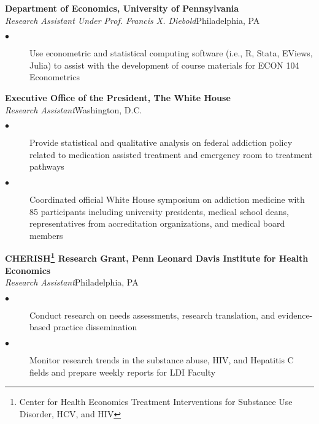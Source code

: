 \documentclass[10pt, letterpaper]{article}
\newcommand{\years}[1]{\marginnote{\normalsize #1}}
\begin{document}
\years{2017-2018}
\textbf{Department of Economics, University of Pennsylvania}\\%
\emph{Research Assistant Under Prof. Francis X. Diebold}\hfill Philadelphia, PA
\begin{description}
    \item[$\bullet$] Use econometric and statistical computing software (i.e., R, Stata, EViews, Julia) to assist with the development of course materials for ECON 104 Econometrics
    \\[.2cm]
\end{description}



\years{2016}
 \textbf{Executive Office of the President, The White House}\\%
 \emph{Research Assistant}\hfill Washington, D.C.
\begin{description}
    \item[$\bullet$] Provide statistical and qualitative analysis on federal addiction policy related to medication assisted treatment and emergency room to treatment pathways
    \item[$\bullet$] Coordinated official %
    White House symposium on addiction medicine
    with 85 participants including university presidents, medical school deans, representatives from accreditation organizations, and medical board members\\[.2cm]
\end{description}

\years{2016}
\textbf{CHERISH\footnote{Center for Health Economics Treatment Interventions for Substance Use Disorder, HCV, and HIV} Research Grant, Penn Leonard Davis Institute for Health Economics}\\%
\emph{Research Assistant}\hfill Philadelphia, PA
\begin{description}
    \item[$\bullet$] Conduct research on needs assessments, research translation, and evidence-based practice dissemination
    \item[$\bullet$] Monitor research trends in the substance abuse, HIV, and Hepatitis C fields and prepare weekly reports for LDI Faculty\\[.2cm]
\end{description}
\end{document}
